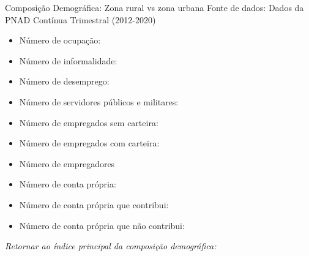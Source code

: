 \begin{frame}[label=_composicao_demografica_rural_urbano]{Composição Demográfica: Zona rural vs zona urbana}
{\footnotesize Fonte de dados: Dados da PNAD Contínua Trimestral (2012-2020)}
\begin{itemize}
\item{Número de ocupação: \hyperlink{_composicao_demografica_rural_urbano_n_de_ocupacao}{}}
\item{Número de informalidade: \hyperlink{_composicao_demografica_rural_urbano_n_de_informalidade}{}}
\item{Número de desemprego: \hyperlink{_composicao_demografica_rural_urbano_n_de_desemprego}{}}
\item{Número de servidores públicos e militares: \hyperlink{_composicao_demografica_rural_urbano_n_militar}{}}
\item{Número de empregados sem carteira: \hyperlink{_composicao_demografica_rural_urbano_n_empregadoSC}{}}
\item{Número de empregados com carteira: \hyperlink{_composicao_demografica_rural_urbano_n_empregadoCC}{}}
\item{Número de empregadores \hyperlink{_composicao_demografica_rural_urbano_n_empregador}{}}
\item{Número de conta própria: \hyperlink{_composicao_demografica_rural_urbano_n_cpropria}{}}
\item{Número de conta própria que contribui: \hyperlink{_composicao_demografica_rural_urbano_n_cpropriaC}{}}
\item{Número de conta própria que não contribui: \hyperlink{_composicao_demografica_rural_urbano_n_cpropriaNc}{}}
\end{itemize}

\begin{small}
\textit{Retornar ao índice principal da composição demográfica: \hyperlink{_composicao_demografica}{} }
\end{small}

\end{frame}

